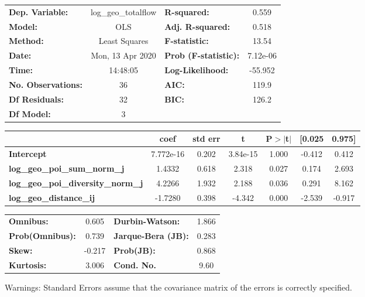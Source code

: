 \begin{center}
\begin{tabular}{lclc}
\toprule
\textbf{Dep. Variable:}                    & log\_geo\_totalflow & \textbf{  R-squared:         } &     0.559   \\
\textbf{Model:}                            &         OLS         & \textbf{  Adj. R-squared:    } &     0.518   \\
\textbf{Method:}                           &    Least Squares    & \textbf{  F-statistic:       } &     13.54   \\
\textbf{Date:}                             &   Mon, 13 Apr 2020  & \textbf{  Prob (F-statistic):} &  7.12e-06   \\
\textbf{Time:}                             &       14:48:05      & \textbf{  Log-Likelihood:    } &   -55.952   \\
\textbf{No. Observations:}                 &            36       & \textbf{  AIC:               } &     119.9   \\
\textbf{Df Residuals:}                     &            32       & \textbf{  BIC:               } &     126.2   \\
\textbf{Df Model:}                         &             3       & \textbf{                     } &             \\
\bottomrule
\end{tabular}
\begin{tabular}{lcccccc}
                                           & \textbf{coef} & \textbf{std err} & \textbf{t} & \textbf{P$> |$t$|$} & \textbf{[0.025} & \textbf{0.975]}  \\
\midrule
\textbf{Intercept}                         &    7.772e-16  &        0.202     &  3.84e-15  &         1.000        &       -0.412    &        0.412     \\
\textbf{log\_geo\_poi\_sum\_norm\_j}       &       1.4332  &        0.618     &     2.318  &         0.027        &        0.174    &        2.693     \\
\textbf{log\_geo\_poi\_diversity\_norm\_j} &       4.2266  &        1.932     &     2.188  &         0.036        &        0.291    &        8.162     \\
\textbf{log\_geo\_distance\_ij}            &      -1.7280  &        0.398     &    -4.342  &         0.000        &       -2.539    &       -0.917     \\
\bottomrule
\end{tabular}
\begin{tabular}{lclc}
\textbf{Omnibus:}       &  0.605 & \textbf{  Durbin-Watson:     } &    1.866  \\
\textbf{Prob(Omnibus):} &  0.739 & \textbf{  Jarque-Bera (JB):  } &    0.283  \\
\textbf{Skew:}          & -0.217 & \textbf{  Prob(JB):          } &    0.868  \\
\textbf{Kurtosis:}      &  3.006 & \textbf{  Cond. No.          } &     9.60  \\
\bottomrule
\end{tabular}
\end{center}

Warnings: \newline
 [1] Standard Errors assume that the covariance matrix of the errors is correctly specified.